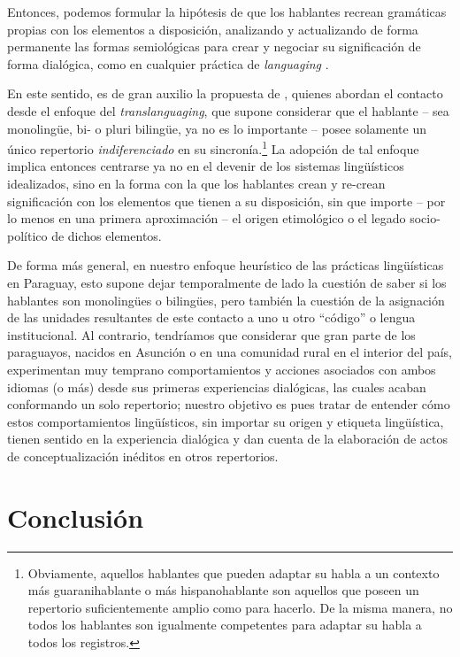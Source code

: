 \documentclass[output=paper]{langscibook}
\begin{document}
Entonces, podemos formular la hipótesis de que los hablantes recrean gramáticas propias con los elementos a disposición, analizando y actualizando de forma permanente las formas semiológicas para crear y negociar su significación de forma dialógica, como en cualquier práctica de \textit{languaging} \citep{Maturana1970}.



En este sentido, es de gran auxilio la propuesta de \citet{OtheguyEtAl2015,OtheguyEtAl2018}, quienes abordan el contacto desde el enfoque del \textit{translanguaging}, que supone considerar que el hablante \- -- sea monolingüe, bi- o pluri bilingüe, ya no es lo importante\-\- -- posee solamente un único repertorio \textit{indiferenciado} en su sincronía.\footnote{Obviamente, aquellos hablantes que pueden adaptar su habla a un contexto más guaranihablante o más hispanohablante son aquellos que poseen un repertorio suficientemente amplio como para hacerlo. De la misma manera, no todos los hablantes son igualmente competentes para adaptar su habla a todos los registros.} La adopción de tal enfoque implica entonces centrarse ya no en el devenir de los sistemas lingüísticos idealizados, sino en la forma con la que los hablantes crean y re-crean significación con los elementos que tienen a su disposición, sin que importe  -- por lo menos en una primera aproximación --  el origen etimológico o el legado socio-político de dichos elementos.



De forma más general, en nuestro enfoque heurístico de las prácticas lingüísticas en Paraguay, esto supone dejar temporalmente de lado la cuestión de saber si los hablantes son monolingües o bilingües, pero también la cuestión de la asignación de las unidades resultantes de este contacto a uno u otro “código” o lengua institucional. Al contrario, tendríamos que considerar que gran parte de los paraguayos, nacidos en Asunción o en una comunidad rural en el interior del país, experimentan muy temprano comportamientos y acciones asociados con ambos idiomas (o más) desde sus primeras experiencias dialógicas, las cuales acaban conformando un solo repertorio; nuestro objetivo es pues tratar de entender cómo estos comportamientos lingüísticos, sin importar su origen y etiqueta lingüística, tienen sentido en la experiencia dialógica y dan cuenta de la elaboración de actos de conceptualización inéditos en otros repertorios. 


 \section{Conclusión}
\end{document}
